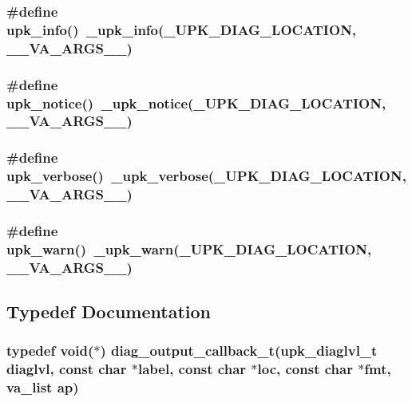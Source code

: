 \subsubsection{\setlength{\rightskip}{0pt plus 5cm}\#define upk\_\-info()~\_\-upk\_\-info(\_\-UPK\_\-DIAG\_\-LOCATION, \_\-\_\-VA\_\-ARGS\_\-\_\-)}\label{group__upk__errors_gcbbbca1edc99421ba03ece46f8bb55be}


\subsubsection{\setlength{\rightskip}{0pt plus 5cm}\#define upk\_\-notice()~\_\-upk\_\-notice(\_\-UPK\_\-DIAG\_\-LOCATION, \_\-\_\-VA\_\-ARGS\_\-\_\-)}\label{group__upk__errors_g83be2c568ce6d0942d2f483e3ca7cff6}


\subsubsection{\setlength{\rightskip}{0pt plus 5cm}\#define upk\_\-verbose()~\_\-upk\_\-verbose(\_\-UPK\_\-DIAG\_\-LOCATION, \_\-\_\-VA\_\-ARGS\_\-\_\-)}\label{group__upk__errors_ge47f0b840f32157a673f74343c9e1cac}


\subsubsection{\setlength{\rightskip}{0pt plus 5cm}\#define upk\_\-warn()~\_\-upk\_\-warn(\_\-UPK\_\-DIAG\_\-LOCATION, \_\-\_\-VA\_\-ARGS\_\-\_\-)}\label{group__upk__errors_gdbd2453bc884915622b41ed437982a4c}




\subsection{Typedef Documentation}
\subsubsection{\setlength{\rightskip}{0pt plus 5cm}typedef void($\ast$) \bf{diag\_\-output\_\-callback\_\-t}(\bf{upk\_\-diaglvl\_\-t} diaglvl, const char $\ast$label, const char $\ast$loc, const char $\ast$fmt, va\_\-list ap)}\label{group__upk__errors_gc8f4bb3c4ff49584ee62d2b3b69f10ea}


